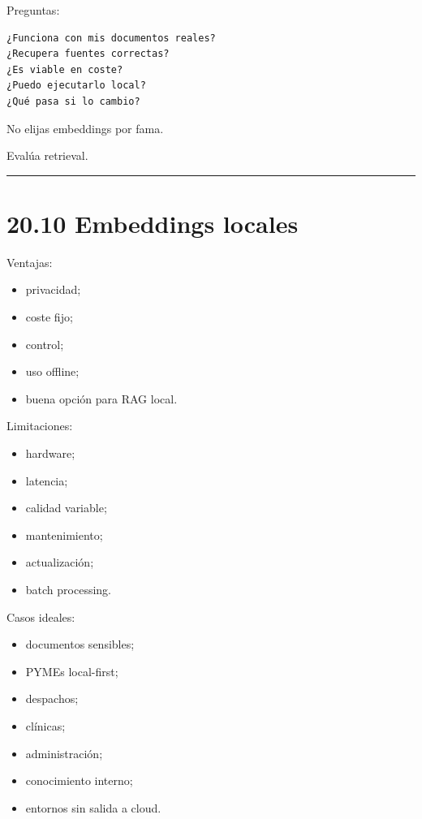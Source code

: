 Preguntas:

\begin{lstlisting}
¿Funciona con mis documentos reales?
¿Recupera fuentes correctas?
¿Es viable en coste?
¿Puedo ejecutarlo local?
¿Qué pasa si lo cambio?
\end{lstlisting}

No elijas embeddings por fama.

Evalúa retrieval.

\begin{center}\rule{0.5\linewidth}{0.5pt}\end{center}

\section{20.10 Embeddings locales}\label{embeddings-locales-1}

Ventajas:

\begin{itemize}
\tightlist
\item
  privacidad;
\item
  coste fijo;
\item
  control;
\item
  uso offline;
\item
  buena opción para RAG local.
\end{itemize}

Limitaciones:

\begin{itemize}
\tightlist
\item
  hardware;
\item
  latencia;
\item
  calidad variable;
\item
  mantenimiento;
\item
  actualización;
\item
  batch processing.
\end{itemize}

Casos ideales:

\begin{itemize}
\tightlist
\item
  documentos sensibles;
\item
  PYMEs local-first;
\item
  despachos;
\item
  clínicas;
\item
  administración;
\item
  conocimiento interno;
\item
  entornos sin salida a cloud.
\end{itemize}

